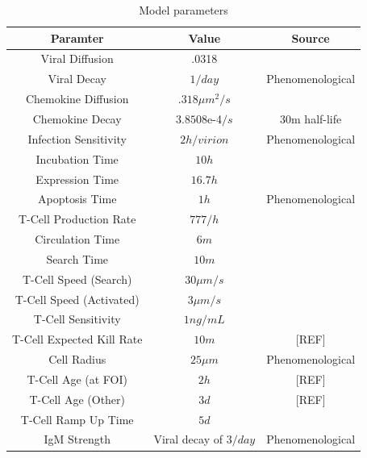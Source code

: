 \documentclass[10pt]{article}
\begin{document}
\begin{table}
\begin{center}
\begin{tabular}{ | c | c | c | }
  \hline                        
  Paramter & Value & Source \\
  \hline
  Viral Diffusion & .0318 & \cite{Beauchemin2006} \\
  Viral Decay &  $1/day$ & Phenomenological \\
  Chemokine Diffusion & $.318 \mu m^2/s$ & \cite{Beauchemin2006} \\
  Chemokine Decay &  $3.8508$e-4$/s$ & 30m half-life \\
  Infection Sensitivity &  $2 h/virion$ & Phenomenological \\
  Incubation Time &  $10 h$ & \cite{Mitchell2011} \\
  Expression Time &  $16.7 h$ & \cite{Mitchell2011} \\
  Apoptosis Time & $1 h$ & Phenomenological \\
  T-Cell Production Rate & $777/h$ & \cite{Miao2010} \\ 
  Circulation Time & $6 m$ & \cite{Banerjee2010b} \\
  Search Time & $10 m$ & \cite{Banerjee2010b} \\
  T-Cell Speed (Search) & $30 \mu m/s$ & \cite{Miller2003} \\
  T-Cell Speed (Activated) & $3 \mu m/s$ & \cite{Miller2003} \\
  T-Cell Sensitivity & $1 ng/mL$ & \cite{Gao2003} \\
  T-Cell Expected Kill Rate & $10 m$ & [REF] \\
  Cell Radius & $25 \mu m$ & Phenomenological \\
  T-Cell Age (at FOI) & $2 h$ & [REF] \\
  T-Cell Age (Other) & $3 d$ & [REF] \\
  T-Cell Ramp Up Time & $5 d$ & \cite{Banerjee2011} \\
  IgM Strength & Viral decay of $3/day$ & Phenomenological \\
  \hline  
\end{tabular}
\caption{Model parameters}
\label{table:parameters}
\end{center}
\end{table}
\end{document}
